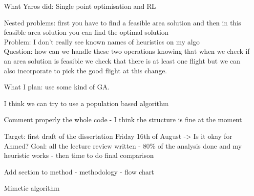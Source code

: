 What Yaros did: Single point optimisation and RL

Nested problems: first you have to find a feasible area solution and then in this feasible area solution you can find the optimal solution
\\Problem: I don't really see known names of heuristics on my algo
\\Question: how can we handle these two operations knowing that when we check if an area solution is feasible we check that there is at least one flight but we can also incorporate to pick the good flight at this change.

What I plan: use some kind of GA. 

I think we can try to use a population based algorithm 

Comment properly the whole code - I think the structure is fine at the moment

Target: first draft of the dissertation Friday 16th of August -> Is it okay for Ahmed?
Goal: all the lecture review written - 80\% of the analysis done and my heuristic works - then time to do final comparison

Add section to method - methodology - flow chart

Mimetic algorithm